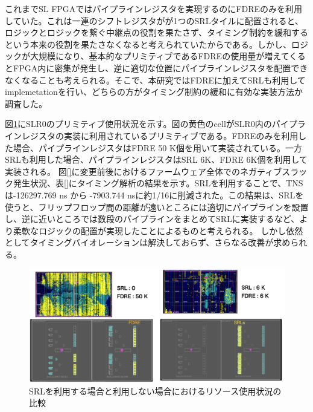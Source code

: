 これまでSL FPGAではパイプラインレジスタを実現するのにFDREのみを利用していた。これは一連のシフトレジスタがが1つのSRLタイルに配置されると、ロジックとロジックを繋ぐ中継点の役割を果たさず、タイミング制約を緩和するという本来の役割を果たさなくなると考えられていたからである。しかし、ロジックが大規模になり、基本的なプリミティブであるFDREの使用量が増えてくるとFPGA内に密集が発生し、逆に適切な位置にパイプラインレジスタを配置できなくなることも考えられる。そこで、本研究ではFDREに加えてSRLも利用してimplemetationを行い、どちらの方がタイミング制約の緩和に有効な実装方法か調査した。

図\ref{SRL_FDRE}にSLR0のプリミティブ使用状況を示す。図の黄色のcellがSLR0内のパイプラインレジスタの実装に利用されているプリミティブである。FDREのみを利用した場合、パイプラインレジスタはFDRE 50 K個を用いて実装されている。一方SRLも利用した場合、パイプラインレジスタはSRL 6K、FDRE 6K個を利用して実装される。
図\ref{}に変更前後におけるファームウェア全体でのネガティブスラック発生状況、表\ref{}にタイミング解析の結果を示す。SRLを利用することで、TNSは-126297.769 ns から -7903.744 nsに約1/16に削減された。この結果は、SRLを使うと、フリップフロップ間の距離が遠いところには適切にパイプラインを設置し、逆に近いところでは数段のパイプラインをまとめてSRLに実装するなど、より柔軟なロジックの配置が実現したことによるものと考えられる。
しかし依然としてタイミングバイオレーションは解決しておらず、さらなる改善が求められる。

\begin{figure} 
\centering
\includegraphics[width=16cm]{fig/SL/SRL_FERE.png}
\caption[SRLを利用する場合と利用しない場合におけるリソース使用状況の比較]{SRLを利用する場合と利用しない場合におけるリソース使用状況の比較}
\label{SRL_FDRE}
\end{figure}



